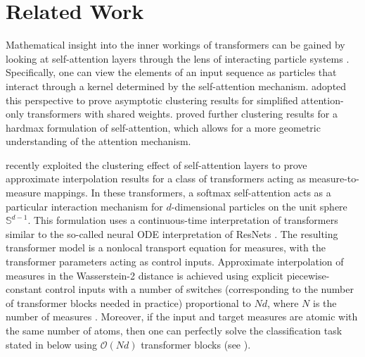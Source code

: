 \section{Related Work}
Mathematical insight into the inner workings of transformers can be gained by looking at self-attention layers through the lens of interacting particle systems \cite{lu2019understanding,sanderSinkformers2022}. Specifically, one can view the elements of an input sequence as particles that interact through a kernel determined by the self-attention mechanism. \citet{geshkovski2023emergence, geshkovski_mathematical_2023} adopted this perspective to prove asymptotic clustering results for simplified attention-only transformers with shared weights. \citet{alcalde2024clustering} proved further clustering results for a hardmax formulation of self-attention, which allows for a more geometric understanding of the attention mechanism.

\citet{geshkovski2024measure} recently exploited the clustering effect of self-attention layers to prove approximate interpolation results for a class of transformers acting as measure-to-measure mappings. In these transformers, a softmax self-attention acts as a particular interaction mechanism for $d$-dimensional particles on the unit sphere $\mathbb{S}^{d-1}$. This formulation uses a continuous-time interpretation of transformers similar to the so-called neural ODE interpretation of ResNets \cite{Weinan2017APO,NODES2018}. The resulting transformer model is a nonlocal transport equation for measures, with the transformer parameters acting as control inputs. Approximate interpolation of measures in the Wasserstein-2 distance is achieved using explicit piecewise-constant control inputs with a number of switches (corresponding to the number of transformer blocks needed in practice) proportional to $Nd$, where $N$ is the number of measures \citep[Theorem~1.1]{geshkovski2024measure}. Moreover, if the input and target measures are atomic with the same number of atoms, then one can perfectly solve the classification task stated in  below using $\mathcal{O}(Nd)$ transformer blocks (see \cite[\S1.4.2]{geshkovski2024measure}).
%
